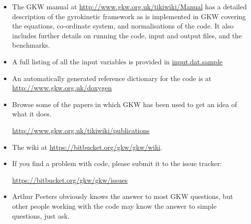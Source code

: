 \documentclass[a4paper,10pt]{article}
\newcommand{\doc}[1]{\href{http://bitbucket.org/gkw/gkw/src/HEAD/doc/#1}{#1}}
\begin{document}
\begin{itemize}
\item The GKW manual at \href{http://www.gkw.org.uk/tikiwiki/Manual}{http://www.gkw.org.uk/tikiwiki/Manual} has a detailed description of the gyrokinetic framework as is implemented in GKW covering the equations, co-ordinate system, and normalisations of the code.  It also includes further details on running the code, input and output files, and the benchmarks.

\item A full listing of all the input variables is provided in \doc{input.dat.sample}

\item An automatically generated reference dictionary for the code is at 
\href{http://www.gkw.org.uk/doxygen}{http://www.gkw.org.uk/doxygen}

\item Browse some of the papers in which GKW has been used to get an idea of what it does.

\href{http://www.gkw.org.uk/tikiwiki/publications}{http://www.gkw.org.uk/tikiwiki/publications}

\item The wiki at \href{https://bitbucket.org/gkw/gkw/wiki}{https://bitbucket.org/gkw/gkw/wiki}.

\item If you find a problem with code, please submit it to the issue tracker: 

\href{https://bitbucket.org/gkw/gkw/issues}{https://bitbucket.org/gkw/gkw/issues}

\item Arthur Peeters obviously knows the answer to most GKW questions, but other people working with the code may know the answer to simple questions, just ask.  

\end{itemize}
\end{document}

